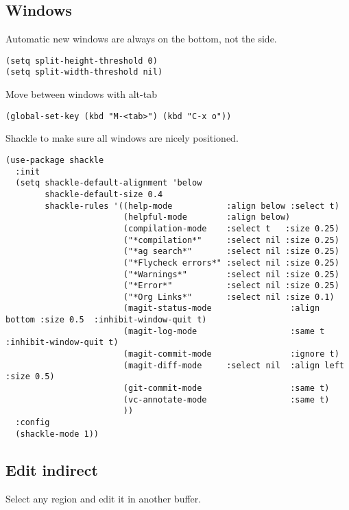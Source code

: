 \documentclass[11pt]{article}
\begin{document}
\subsection{Windows}
\label{sec:orgf30635f}

Automatic new windows are always on the bottom, not the side.

\begin{verbatim}
(setq split-height-threshold 0)
(setq split-width-threshold nil)
\end{verbatim}

Move between windows with alt-tab

\begin{verbatim}
(global-set-key (kbd "M-<tab>") (kbd "C-x o"))
\end{verbatim}

Shackle to make sure all windows are nicely positioned.
\begin{verbatim}
(use-package shackle
  :init
  (setq shackle-default-alignment 'below
        shackle-default-size 0.4
        shackle-rules '((help-mode           :align below :select t)
                        (helpful-mode        :align below)
                        (compilation-mode    :select t   :size 0.25)
                        ("*compilation*"     :select nil :size 0.25)
                        ("*ag search*"       :select nil :size 0.25)
                        ("*Flycheck errors*" :select nil :size 0.25)
                        ("*Warnings*"        :select nil :size 0.25)
                        ("*Error*"           :select nil :size 0.25)
                        ("*Org Links*"       :select nil :size 0.1)
                        (magit-status-mode                :align bottom :size 0.5  :inhibit-window-quit t)
                        (magit-log-mode                   :same t                  :inhibit-window-quit t)
                        (magit-commit-mode                :ignore t)
                        (magit-diff-mode     :select nil  :align left   :size 0.5)
                        (git-commit-mode                  :same t)
                        (vc-annotate-mode                 :same t)
                        ))
  :config
  (shackle-mode 1))
\end{verbatim}

\subsection{Edit indirect}
\label{sec:orgce81f1c}

Select any region and edit it in another buffer.
\end{document}
